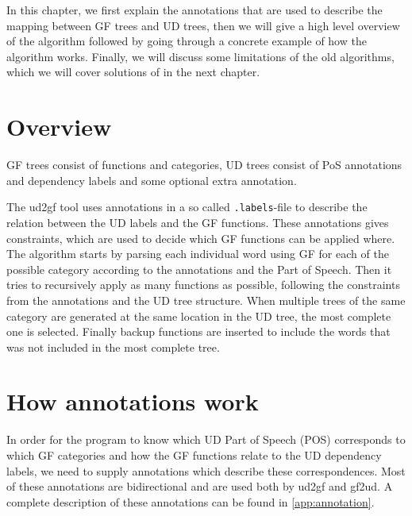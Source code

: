 





In this chapter, we first explain the annotations that are used to describe the mapping between GF trees and UD trees, then we will give a high level overview of the algorithm followed by going through a concrete example of how the algorithm works. Finally, we will discuss some limitations of the old algorithms, which we will cover solutions of in the next chapter.

\section{Overview}


GF trees consist of functions and categories, UD trees consist of PoS annotations and dependency labels and some optional extra annotation.

The ud2gf tool uses annotations in a so called \verb|.labels|-file to describe the relation between the UD labels and the GF functions. These annotations gives constraints, which are used to decide which GF functions can be applied where. The algorithm starts by parsing each individual word using GF for each of the possible category according to the annotations and the Part of Speech. Then it tries to recursively apply as many functions as possible, following the constraints from the annotations and the UD tree structure. When multiple trees of the same category are generated at the same location in the UD tree, the most complete one is selected. Finally backup functions are inserted to include the words that was not included in the most complete tree.

\section{How annotations work}

In order for the program to know which UD Part of Speech (POS) corresponds to which GF categories and how the GF functions relate to the UD dependency labels, we need to supply annotations which describe these correspondences. Most of these annotations are bidirectional and are used both by ud2gf and gf2ud. A complete description of these annotations can be found in \autoref{app:annotation}.


